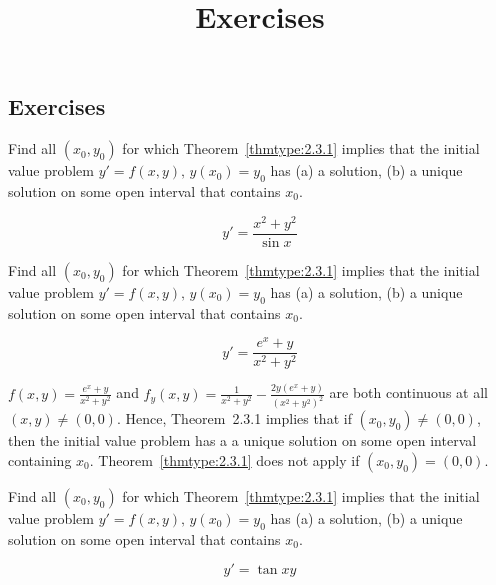 \documentclass{ximera}
\title{Exercises} \license{CC BY-NC-SA 4.0}
\begin{document}
\begin{abstract}
\end{abstract}
\maketitle

\begin{onlineOnly}
\section*{Exercises}
\end{onlineOnly}

\begin{problem}\label{exer:2.3.1} 
Find all $(x_0,y_0)$ for
which Theorem~\ref{thmtype:2.3.1}
implies that the initial value problem $y'=f(x,y),\,  y(x_0)=y_0$ has
(a) a solution, (b) a  unique solution on some open interval that contains $x_0$.

$$y'=\frac{x^2+y^2}{\sin x}$$
\end{problem}

\begin{problem}\label{exer:2.3.2} Find all $(x_0,y_0)$ for
which Theorem~\ref{thmtype:2.3.1}
implies that the initial value problem $y'=f(x,y),\,  y(x_0)=y_0$ has
(a) a solution, (b) a  unique solution on some open interval that contains $x_0$.

$$y'=\frac{e^x+y}{x^2+y^2}$$ 



\begin{solution}
    $f(x,y)=\frac{e^x+y}{ x^2+y^2}$ and $f_y(x,y)=\frac{1}{
x^2+y^2}-\frac{2y(e^x+y)}{(x^2+y^2)^2}$ are both continuous at all
$(x,y)\ne(0,0)$. Hence,  Theorem~2.3.1 implies that if
$(x_0,y_0)\ne(0,0)$, then  the initial
value problem has a a unique solution on some open interval containing
$x_0$.  Theorem~\ref{thmtype:2.3.1} does not apply
if $(x_0,y_0)=(0,0)$.
\end{solution}
\end{problem}

\begin{problem}\label{exer:2.3.3} Find all $(x_0,y_0)$ for
which Theorem~\ref{thmtype:2.3.1}
implies that the initial value problem $y'=f(x,y),\,  y(x_0)=y_0$ has
(a) a solution, (b) a  unique solution on some open interval that contains $x_0$.

$$y'= \tan xy$$
\end{problem}
\end{document}
